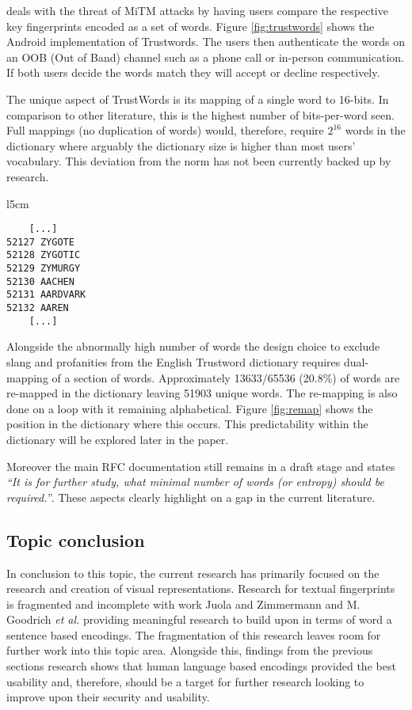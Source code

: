 \pep deals with the threat of MiTM attacks by having users compare the respective key fingerprints encoded as a set of words. Figure \ref{fig:trustwords} shows the \pep Android implementation of Trustwords. The users then authenticate the words on an OOB (Out of Band) channel such as a phone call or in-person communication. If both users decide the words match they will accept or decline respectively.

The unique aspect of TrustWords is its mapping of a single word to 16-bits. In comparison to other literature, this is the highest number of bits-per-word seen. Full mappings (no duplication of words) would, therefore, require $2^{16}$ words in the dictionary where arguably the dictionary size is higher than most users' vocabulary. This deviation from the norm has not been currently backed up by research. 

\begin{wrapfigure}{l}{5cm}
    \centering
    \begin{BVerbatim}
    [...]
52127 ZYGOTE
52128 ZYGOTIC
52129 ZYMURGY
52130 AACHEN
52131 AARDVARK
52132 AAREN
    [...]
    \end{BVerbatim}
    \caption{Re-mapping position in Trustword dictionary}
    \label{fig:remap}
\end{wrapfigure}

Alongside the abnormally high number of words the design choice to exclude slang and profanities from the English Trustword dictionary requires dual-mapping of a section of words. Approximately 13633/65536 (20.8\%) of words are re-mapped in the dictionary leaving 51903 unique words. The re-mapping is also done on a loop with it remaining alphabetical. Figure \ref{fig:remap} shows the position in the dictionary where this occurs. This predictability within the dictionary will be explored later in the paper.

Moreover the main RFC documentation still remains in a draft stage and states \textit{``It is for further study, what minimal number of words (or entropy) should be required.''}. These aspects clearly highlight on a gap in the current literature.

\subsection{Topic conclusion}

In conclusion to this topic, the current research has primarily focused on the research and creation of visual representations. Research for textual fingerprints is fragmented and incomplete with work Juola and Zimmermann 
\cite{juola1996whole} and M. Goodrich \textit{et al.}\cite{goodrich2006loud} providing meaningful research to build upon in terms of word a sentence based encodings. The fragmentation of this research leaves room for further work into this topic area. Alongside this, findings from the previous sections research shows that human language based encodings provided the best usability and, therefore, should be a target for further research looking to improve upon their security and usability.

